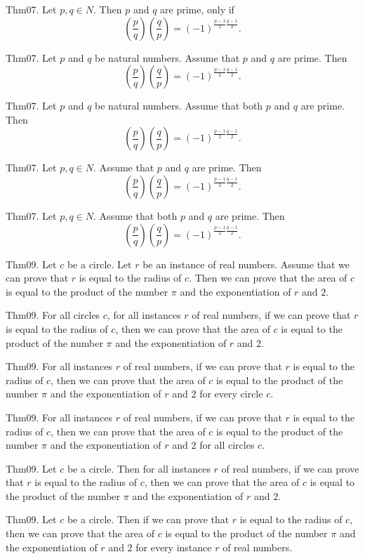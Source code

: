 \documentclass{article}
\begin{document}
Thm07. Let $p , q \in N$. Then $p$ and $q$ are prime, only if $$\left(\frac{ p }{ q }\right) \left(\frac{ q }{ p }\right) = (- 1)^ {\frac{ p - 1}{2}\frac{ q - 1}{2}}.$$

Thm07. Let $p$ and $q$ be natural numbers. Assume that $p$ and $q$ are prime. Then $$\left(\frac{ p }{ q }\right) \left(\frac{ q }{ p }\right) = (- 1)^ {\frac{ p - 1}{2}\frac{ q - 1}{2}}.$$

Thm07. Let $p$ and $q$ be natural numbers. Assume that both $p$ and $q$ are prime. Then $$\left(\frac{ p }{ q }\right) \left(\frac{ q }{ p }\right) = (- 1)^ {\frac{ p - 1}{2}\frac{ q - 1}{2}}.$$

Thm07. Let $p , q \in N$. Assume that $p$ and $q$ are prime. Then $$\left(\frac{ p }{ q }\right) \left(\frac{ q }{ p }\right) = (- 1)^ {\frac{ p - 1}{2}\frac{ q - 1}{2}}.$$

Thm07. Let $p , q \in N$. Assume that both $p$ and $q$ are prime. Then $$\left(\frac{ p }{ q }\right) \left(\frac{ q }{ p }\right) = (- 1)^ {\frac{ p - 1}{2}\frac{ q - 1}{2}}.$$

Thm09. Let $c$ be a circle. Let $r$ be an instance of real numbers. Assume that we can prove that $r$ is equal to the radius of $c$. Then we can prove that the area of $c$ is equal to the product of the number \(\pi\) and the exponentiation of $r$ and $2$.

Thm09. For all circles $c$, for all instances $r$ of real numbers, if we can prove that $r$ is equal to the radius of $c$, then we can prove that the area of $c$ is equal to the product of the number \(\pi\) and the exponentiation of $r$ and $2$.

Thm09. For all instances $r$ of real numbers, if we can prove that $r$ is equal to the radius of $c$, then we can prove that the area of $c$ is equal to the product of the number \(\pi\) and the exponentiation of $r$ and $2$ for every circle $c$.

Thm09. For all instances $r$ of real numbers, if we can prove that $r$ is equal to the radius of $c$, then we can prove that the area of $c$ is equal to the product of the number \(\pi\) and the exponentiation of $r$ and $2$ for all circles $c$.

Thm09. Let $c$ be a circle. Then for all instances $r$ of real numbers, if we can prove that $r$ is equal to the radius of $c$, then we can prove that the area of $c$ is equal to the product of the number \(\pi\) and the exponentiation of $r$ and $2$.

Thm09. Let $c$ be a circle. Then if we can prove that $r$ is equal to the radius of $c$, then we can prove that the area of $c$ is equal to the product of the number \(\pi\) and the exponentiation of $r$ and $2$ for every instance $r$ of real numbers.
\end{document}

